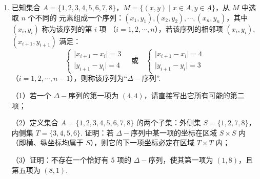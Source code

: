 \documentclass[a4paper,11pt]{article}
\begin{document}
\begin{enumerate}
\item 已知集合 $A=\{1,2,3,4,5,6,7,8\}$，$M=\{(x,y)\mid x\in A,y\in A\}$，从 $M$ 中选取 $n$ 个不同的
元素组成一个序列：$(x_1,y_1)$,$(x_2,y_2),\cdots,(x_n,y_n)$，其中 $(x_i,y_i)$ 称为该序列的第 $i$ 项
（$i=1,2,\cdots,n$），若该序列的相邻项 $(x_i,y_i)$,$(x_{i+1},y_{i+1})$ 满足：
\[\begin{cases}\lvert x_{i+1}-x_i\rvert=3\\\lvert y_{i+1}-y_i\rvert=4\end{cases}
\quad\text{或}\quad
\begin{cases}\lvert x_{i+1}-x_i\rvert=4\\\lvert y_{i+1}-y_i\rvert=3\end{cases}\]
（$i=1,2,\cdots,n-1$），则称该序列为“$\Delta-$序列”.

（1）若一个 $\Delta-$序列的第一项为 $(4,4)$，请直接写出它所有可能的第二项；

（2）定义集合 $A=\{1,2,3,4,5,6,7,8\}$ 的两个子集：外侧集 $S=\{1,2,7,8\}$，内侧集
$T=\{3,4,5,6\}$. 证明：若 $\Delta-$序列中某一项的坐标在区域 $S\times S$ 内（即横、纵坐标均属于
$S$），则它的下一项坐标必定在区域 $T\times T$ 内；

（3）证明：不存在一个恰好有 5 项的 $\Delta-$序列，使其第一项为 $(1,8)$，且第五项为
$(8,1)$.


\end{enumerate}
\end{document}
